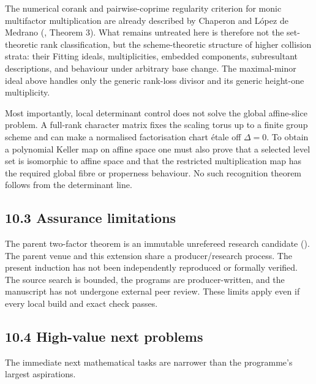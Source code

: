 \documentclass[
  11pt,
  a4paper,
]{article}
\begin{document}
The numerical corank and pairwise-coprime regularity criterion for monic
multifactor multiplication are already described by Chaperon and López
de Medrano (, Theorem 3). What remains untreated here is therefore
not the set-theoretic rank classification, but the scheme-theoretic
structure of higher collision strata: their Fitting ideals,
multiplicities, embedded components, subresultant descriptions, and
behaviour under arbitrary base change. The maximal-minor ideal above
handles only the generic rank-loss divisor and its generic height-one
multiplicity.

Most importantly, local determinant control does not solve the global
affine-slice problem. A full-rank character matrix fixes the scaling
torus up to a finite group scheme and can make a normalised
factorisation chart étale off \(\Delta=0\). To obtain a polynomial
Keller map on affine space one must also prove that a selected level set
is isomorphic to affine space and that the restricted multiplication map
has the required global fibre or properness behaviour. No such
recognition theorem follows from the determinant line.

\subsection{10.3 Assurance limitations}\label{assurance-limitations}

The parent two-factor theorem is an immutable unrefereed research
candidate (). The parent venue and this extension share a producer/research
process. The present induction has not been independently reproduced or
formally verified. The source search is bounded, the programs are
producer-written, and the manuscript has not undergone external peer
review. These limits apply even if every local build and exact check
passes.

\subsection{10.4 High-value next
problems}\label{high-value-next-problems}

The immediate next mathematical tasks are narrower than the programme's
largest aspirations.
\end{document}
